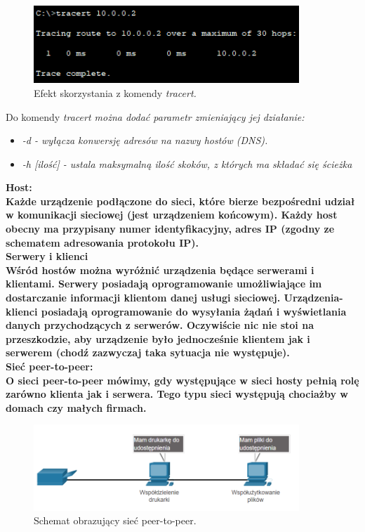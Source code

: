 \documentclass[a4paper,12pt]{article}
\newcommand{\h}[1]{\noindent \bf #1 \rm \\ \noindent}
\newcommand{\italic}[1]{\it #1 \rm}
\begin{document}
\begin{figure}[H]
	\centering
	\includegraphics[width=10cm]{fig3.png}
	\caption{Efekt skorzystania z komendy \it tracert\rm.}
\end{figure}

Do komendy \italic{tracert} można dodać parametr zmieniający jej działanie:
\begin{itemize}
	\item \italic{-d} - wyłącza konwersję adresów na nazwy hostów (DNS).
	\item \italic{-h [ilość]} - ustala maksymalną ilość skoków, z których ma składać się ścieżka
\end{itemize}

\h{Host:}
Każde urządzenie podłączone do sieci, które bierze bezpośredni udział w komunikacji sieciowej (jest urządzeniem końcowym). Każdy host obecny ma przypisany numer identyfikacyjny, adres IP (zgodny ze schematem adresowania protokołu IP).\\

\h{Serwery i klienci}
Wśród hostów można wyróżnić urządzenia będące serwerami i klientami. Serwery posiadają oprogramowanie umożliwiające im dostarczanie informacji klientom danej usługi sieciowej. Urządzenia-klienci posiadają oprogramowanie do wysyłania żądań i wyświetlania danych przychodzących z serwerów. Oczywiście nic nie stoi na przeszkodzie, aby urządzenie było jednocześnie klientem jak i serwerem (chodź zazwyczaj taka sytuacja nie występuje).\\

\h{Sieć peer-to-peer:}
O sieci peer-to-peer mówimy, gdy występujące w sieci hosty pełnią rolę zarówno klienta jak i serwera. Tego typu sieci występują chociażby w domach czy małych firmach.
\begin{figure}[H]
	\centering
	\includegraphics[width=10cm]{fig4.png}
	\caption{Schemat obrazujący sieć peer-to-peer.}
\end{figure}
\end{document}
